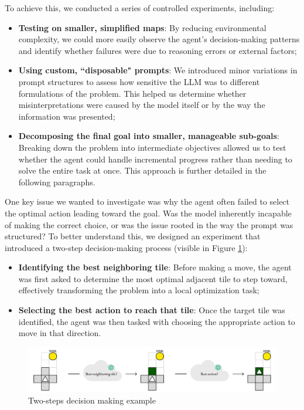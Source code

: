 To achieve this, we conducted a series of controlled experiments, including:
\begin{itemize}
  \item \textbf{Testing on smaller, simplified maps}: By reducing environmental complexity,
    we could more easily observe the agent's decision-making patterns and
    identify whether failures were due to reasoning errors or external factors;

  \item \textbf{Using custom, ``disposable" prompts}: We introduced minor variations
    in prompt structures to assess how sensitive the LLM was to different formulations
    of the problem. This helped us determine whether misinterpretations were
    caused by the model itself or by the way the information was presented;

  \item \textbf{Decomposing the final goal into smaller, manageable sub-goals}: Breaking
    down the problem into intermediate objectives allowed us to test whether the
    agent could handle incremental progress rather than needing to solve the entire
    task at once. This approach is further detailed in the following paragraphs.
\end{itemize}

One key issue we wanted to investigate was why the agent often failed to select
the optimal action leading toward the goal. Was the model inherently incapable of
making the correct choice, or was the issue rooted in the way the prompt was
structured? To better understand this, we designed an experiment that introduced
a two-step decision-making process (visible in Figure \ref{fig:extra}):
\begin{itemize}
  \item \textbf{Identifying the best neighboring tile}: Before making a move,
    the agent was first asked to determine the most optimal adjacent tile to
    step toward, effectively transforming the problem into a local optimization task;

  \item \textbf{Selecting the best action to reach that tile}: Once the target tile
    was identified, the agent was then tasked with choosing the appropriate
    action to move in that direction.
\end{itemize}

\vspace{7mm}
\begin{figure}[h!]
  \centering
  \includegraphics[width=\textwidth]{images/extra.pdf}
  \caption{Two-steps decision making example}
  \label{fig:extra}
\end{figure}
\vspace{7mm}

